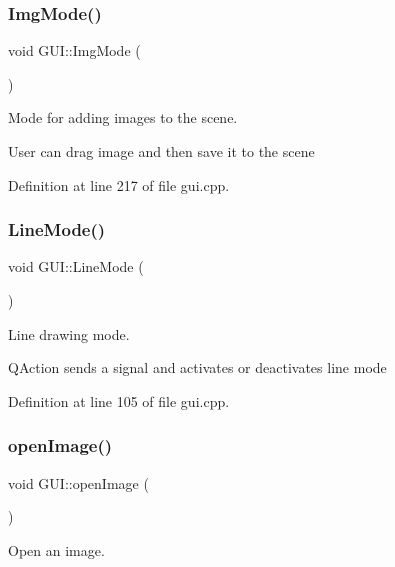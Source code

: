 \mbox{\label{classGUI_a5281fa4256d3ff14df9a95c1c6613bb2}} 
\subsubsection{\texorpdfstring{Img\+Mode()}{ImgMode()}}
{\footnotesize\ttfamily void G\+U\+I\+::\+Img\+Mode (\begin{DoxyParamCaption}{ }\end{DoxyParamCaption})}



Mode for adding images to the scene. 

User can drag image and then save it to the scene 

Definition at line 217 of file gui.\+cpp.

\mbox{\label{classGUI_a91fab5d31617ad5631d17dfceb5a0fad}} 
\subsubsection{\texorpdfstring{Line\+Mode()}{LineMode()}}
{\footnotesize\ttfamily void G\+U\+I\+::\+Line\+Mode (\begin{DoxyParamCaption}{ }\end{DoxyParamCaption})}



Line drawing mode. 

Q\+Action sends a signal and activates or deactivates line mode 

Definition at line 105 of file gui.\+cpp.

\mbox{\label{classGUI_a925c89bd7b32ccc8d726063ed8076f8f}} 
\subsubsection{\texorpdfstring{open\+Image()}{openImage()}}
{\footnotesize\ttfamily void G\+U\+I\+::open\+Image (\begin{DoxyParamCaption}{ }\end{DoxyParamCaption})}



Open an image. 

